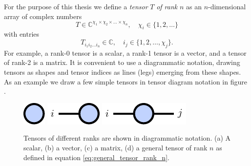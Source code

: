 For the purpose of this thesis we define a \textit{tensor} $T$ \textit{of rank} $n$ as an $n$-dimensional array of complex numbers
\begin{equation}
	\label{eq:general_tensor_rank_n}
	T \in \mathbb{C}^{\chi_1\times\chi_2\times\dots\times\chi_n}, \quad \chi_i \in \{1, 2, \dots\}
\end{equation}
with entries
\begin{equation}
	T_{i_1i_2\dots i_n} \in \mathbb{C}, \quad i_j \in \{1, 2, \dots, \chi_j\}.
\end{equation}
For example, a rank-0 tensor is a scalar, a rank-1 tensor is a vector, and a tensor of rank-2 is a matrix. It is convenient to use a diagrammatic notation, drawing tensors as shapes and tensor indices as lines (legs) emerging from these shapes. As an example we draw a few simple tensors in tensor diagram notation in figure . \par
\begin{figure}[h]
	\centering
	\subcaptionbox{\label{fig:basic_tensor_diagrams_scalar}}
	{%
		\raisebox{\dimexpr.5\ht\largestimage-.5\height}
		{%
			\includegraphics[scale=1]{figures/tikz/Tensor_Networks/basic_diagrams/basic_diagrams_a.pdf}
		}
	}
	\quad\quad
	\subcaptionbox{\label{fig:basic_tensor_diagrams_vector}}
	{%
		\raisebox{\dimexpr.5\ht\largestimage-.5\height}
		{%
			\includegraphics[scale=1]{figures/tikz/Tensor_Networks/basic_diagrams/basic_diagrams_b.pdf}
		}
	}
	\quad\quad
	\subcaptionbox{\label{fig:basic_tensor_diagrams_matrix}}
	{%
		\raisebox{\dimexpr.5\ht\largestimage-.5\height}
		{%
			\includegraphics[scale=1]{figures/tikz/Tensor_Networks/basic_diagrams/basic_diagrams_c.pdf}
		}
	}
	\quad\quad
	\subcaptionbox{\label{fig:basic_tensor_diagrams_rank_n_tensor}}
	{%
		\usebox{\largestimage}
	}
\caption{Tensors of different ranks are shown in diagrammatic notation. (a) A scalar, (b) a vector, (c) a matrix, (d) a general tensor of rank $n$ as defined in equation \eqref{eq:general_tensor_rank_n}.}
\label{fig:basic_tensor_diagrams}
\end{figure}

